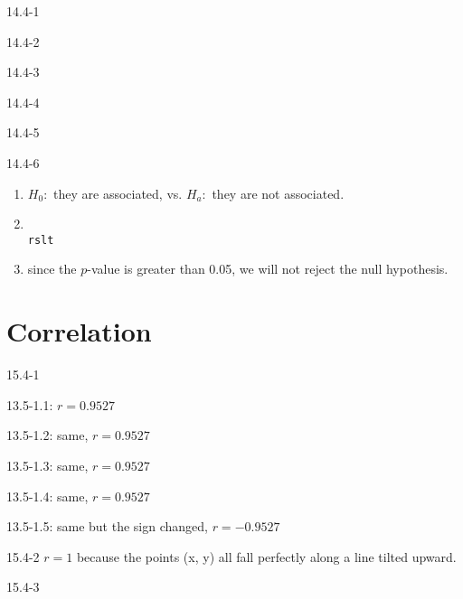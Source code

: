 \begin{exsol@solution}{14.4-1}
\end{exsol@solution}
\begin{exsol@solution}{14.4-2}
\end{exsol@solution}
\begin{exsol@solution}{14.4-3}
\end{exsol@solution}
\begin{exsol@solution}{14.4-4}
\end{exsol@solution}
\begin{exsol@solution}{14.4-5}
\end{exsol@solution}
\begin{exsol@solution}{14.4-6}
\begin{enumerate}

\item $H_0:$ they are associated, vs. $H_a:$ they are not associated.

\item

\begin{verbatim}

rslt

\end{verbatim}

\item since the $p$-value is greater than 0.05, we will not reject the null hypothesis.
\end{enumerate}

\end{exsol@solution}
\setcounter{chapter}{14}\chapter{Correlation}
\begin{exsol@solution}{15.4-1}


13.5-1.1: $r = 0.9527 $

13.5-1.2: same, $r = 0.9527 $

13.5-1.3: same, $r = 0.9527 $

13.5-1.4: same, $r = 0.9527 $

13.5-1.5: same but the sign changed, $r = -0.9527 $

\end{exsol@solution}
\begin{exsol@solution}{15.4-2}
$r = 1$ because the points (x, y) all fall perfectly along a line tilted upward.

\end{exsol@solution}
\begin{exsol@solution}{15.4-3}
\end{exsol@solution}
